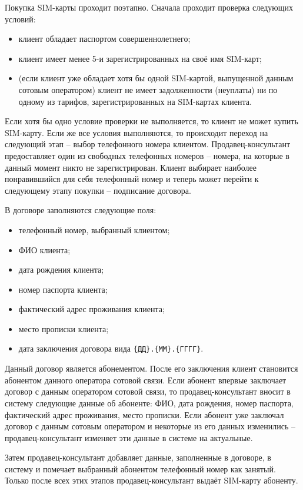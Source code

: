 Покупка SIM-карты проходит поэтапно. Сначала проходит проверка следующих условий:
\begin{itemize}
    \item клиент обладает паспортом совершеннолетнего;
    \item клиент имеет менее 5-и зарегистрированных на своё имя SIM-карт;
    \item (если клиент уже обладает хотя бы одной SIM-картой, выпущенной данным сотовым оператором) клиент не имеет задолженности (неуплаты) ни по одному из тарифов, зарегистрированных на SIM-картах клиента.
\end{itemize}

Если хотя бы одно условие проверки не выполняется, то клиент не может купить SIM-карту. Если же все условия выполняются, то происходит переход на следующий этап -- выбор телефонного номера клиентом. Продавец-консультант предоставляет один из свободных телефонных номеров -- номера, на которые в данный момент никто не зарегистрирован. Клиент выбирает наиболее понравившийся для себя телефонный номер и теперь может перейти к следующему этапу покупки -- подписание договора.

В договоре заполняются следующие поля:
\begin{itemize}
    \item телефонный номер, выбранный клиентом;
    \item ФИО клиента;
    \item дата рождения клиента;
    \item номер паспорта клиента;
    \item фактический адрес проживания клиента;
    \item место прописки клиента;
    \item дата заключения договора вида \texttt{\{ДД\}.\{ММ\}.\{ГГГГ\}}.
\end{itemize}

Данный договор является абонементом. После его заключения клиент становится абонентом данного оператора сотовой связи. Если абонент впервые заключает договор с данным оператором сотовой связи, то продавец-консультант вносит в систему следующие данные об абоненте: ФИО, дата рождения, номер паспорта, фактический адрес проживания, место прописки. Если абонент уже заключал договор с данным сотовым оператором и некоторые из его данных изменились -- продавец-консультант изменяет эти данные в системе на актуальные.

Затем продавец-консультант добавляет данные, заполненные в договоре, в систему и помечает выбранный абонентом телефонный номер как занятый. Только после всех этих этапов продавец-консультант выдаёт SIM-карту абоненту.


